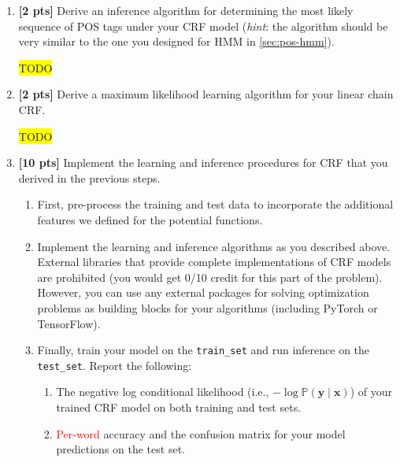 \documentclass[10pt]{article}
\newcommand{\hilight}[1]{\colorbox{yellow}{#1}}
\begin{document}
\begin{enumerate}
    \item \textbf{[2 pts]} Derive an inference algorithm for determining the most likely sequence of POS tags under your CRF model (\emph{hint}: the algorithm should be very similar to the one you designed for HMM in \ref{sec:pos-hmm}).

\begin{solution}
\hilight{TODO}
\end{solution}

    \item \textbf{[2 pts]} Derive a maximum likelihood learning algorithm for your linear chain CRF.

\begin{solution}
\hilight{TODO}
\end{solution}

    \item \textbf{[10 pts]} Implement the learning and inference procedures for CRF that you derived in the previous steps.
    \begin{enumerate}
        \item First, pre-process the training and test data to incorporate the additional features we defined for the potential functions.
        \item Implement the learning and inference algorithms as you described above.
        External libraries that provide complete implementations of CRF models are prohibited (you would get 0/10 credit for this part of the problem).
        However, you can use any external packages for solving optimization problems as building blocks for your algorithms (including PyTorch or TensorFlow).
        \item Finally, train your model on the \texttt{train\_set} and run inference on the \texttt{test\_set}.
        Report the following:
        \begin{enumerate}
            \item The negative log conditional likelihood (i.e., $-\log \mathbb{P}(\mathbf{y} \mid \mathbf{x})$) of your trained CRF model on both training and test sets.
            \item \textcolor{red}{Per-word} accuracy and the confusion matrix for your model predictions on the test set.
        \end{enumerate}
    \end{enumerate}


\end{enumerate}
\end{document}
